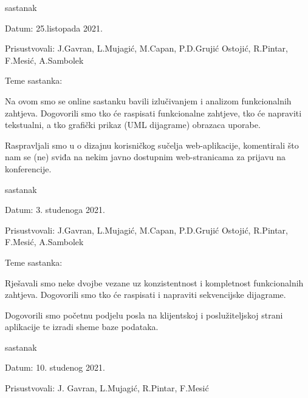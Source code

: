 \begin{packed_enum}
\begin{packed_item}
\begin{packed_item}
				\end{packed_item}
			\end{packed_item}
			\item  sastanak
			\item[] \begin{packed_item}
				\item Datum: 25.listopada 2021.
				\item Prisustvovali: J.Gavran, L.Mujagić, M.Capan, P.D.Grujić Ostojić, R.Pintar, F.Mesić, A.Sambolek
				\item Teme sastanka:
				\begin{packed_item}
					\item Na ovom smo se online sastanku bavili izlučivanjem i analizom funkcionalnih zahtjeva. Dogovorili smo tko će raspisati funkcionalne zahtjeve, tko će napraviti tekstualni, a tko grafički prikaz (UML dijagrame) obrazaca uporabe.
					\item Raspravljali smo u o dizajnu korisničkog sučelja web-aplikacije, komentirali što nam se (ne) sviđa na nekim javno dostupnim web-stranicama za prijavu na konferencije.
				\end{packed_item}
			\end{packed_item}
		     \item  sastanak
		     \item[] \begin{packed_item}
		     		\item Datum: 3. studenoga 2021.
		     		\item Prisustvovali: J.Gavran, L.Mujagić, M.Capan, P.D.Grujić Ostojić, R.Pintar, F.Mesić, A.Sambolek
		     		\item Teme sastanka:
		     		\begin{packed_item}
		     			\item Rješavali smo neke dvojbe vezane uz konzistentnost i kompletnost funkcionalnih zahtjeva. Dogovorili smo tko će raspisati i napraviti sekvencijske dijagrame.
		     			\item Dogovorili smo početnu podjelu posla na klijentskoj i poslužiteljskoj strani aplikacije te izradi sheme baze podataka.
		     	\end{packed_item}
	    	\end{packed_item}	
    		\item  sastanak
    		\item[] \begin{packed_item}
    			\item Datum: 10. studenog 2021.
    			\item Prisustvovali: J. Gavran, L.Mujagić, R.Pintar, F.Mesić

\end{packed_item}
\end{packed_enum}
